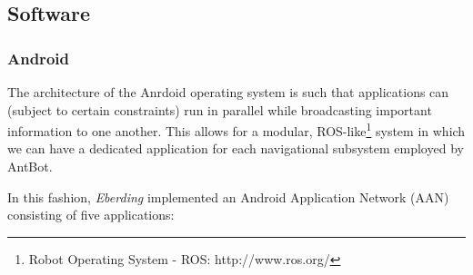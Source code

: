 \documentclass[a4paper,12pt]{article}
\begin{document}
\subsection{ Software }
\subsubsection{ Android } \label{subsubsec:droid}
The architecture of the Anrdoid operating system is such that applications can (subject to certain
constraints) run in parallel while broadcasting important information to one another. This allows
for a modular, ROS-like\footnote{Robot Operating System - ROS: http://www.ros.org/}
system in which we can have a dedicated application for each navigational subsystem employed by AntBot.
\newline

In this fashion, \textit{Eberding} implemented an Android Application Network (AAN) consisting of
five applications:
\newline
\end{document}
